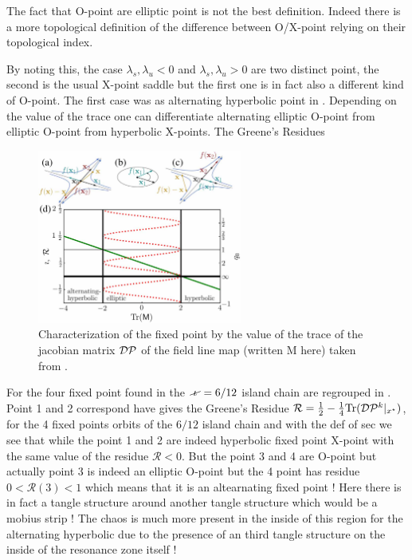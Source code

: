 The fact that O-point are elliptic point is not the best definition. Indeed there is a more topological definition of the difference between O/X-point relying on their topological index. 

By noting this, the case $\lambda_s, \lambda_u < 0$ and $\lambda_s, \lambda_u > 0$ are two distinct point, the second is the usual X-point saddle but the first one is in fact also a different kind of O-point. The first case was as alternating hyperbolic point in \cite{smiet_bifurcations_2020}. Depending on the value of the trace one can differentiate alternating elliptic O-point from elliptic O-point from hyperbolic X-points. The Greene's Residues 

\begin{figure}[H]
    \centering
    \includegraphics[width=0.6\textwidth]{images/theory/smeit_sawtooth.jpg}
    \caption{Characterization of the fixed point by the value of the trace of the jacobian matrix $\mathcal{D}\mathcal{P}$ of the field line map (written M here) taken from \cite{smiet_bifurcations_2020}.}
    \label{fig:smeit-bifurcations}
\end{figure}

For the four fixed point found in the $\iotaslash = 6/12$ island chain are regrouped in . Point 1 and 2 correspond have 
 gives the Greene's Residue $\mathcal{R} = \frac{1}{2} - \frac{1}{4}\text{Tr}(\mathcal{D}\mathcal{P}^k\vert_{x^\star})$, for the 4 fixed points orbits of the $6/12$ island chain and with the def of sec we see that while the point 1 and 2 are indeed hyperbolic fixed point X-point with the same value of the residue $\mathcal{R} < 0$. But the point 3 and 4 are O-point but actually point 3 is indeed an elliptic O-point but the 4 point has residue $0 < \mathcal{R}(3) < 1$ which means that it is an altearnating fixed point ! Here there is in fact a tangle structure around another tangle structure which would be a mobius strip ! The chaos is much more present in the inside of this region for the alternating hyperbolic due to the presence of an third tangle structure on the inside of the resonance zone itself !

